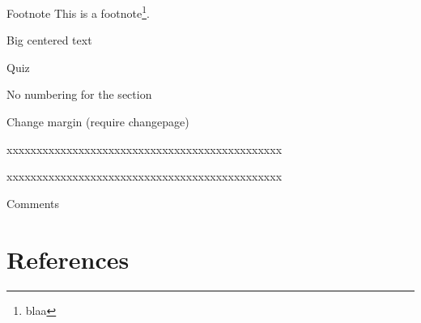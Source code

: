 \documentclass[table]{beamer}
\begin{document}
\begin{frame}[label={sec:orga473990}]{Footnote}
This is a footnote\footnote{blaa}.
\end{frame}
\begin{frame}[label={sec:org0a9c539}]{Big centered text}
\vfill

\begin{center}
\Huge Quiz
\end{center}

\vfill
\end{frame}

\begin{frame}[label={sec:orgf700a10}]{No numbering for the section}
\end{frame}
\begin{frame}[label={sec:orgea60186}]{Change margin}
(require changepage)
\begin{adjustwidth}{-1em}{-1em}
xxxxxxxxxxxxxxxxxxxxxxxxxxxxxxxxxxxxxxxxxxxxxx
\end{adjustwidth}
\begin{adjustwidth}{-3em}{-3em}
xxxxxxxxxxxxxxxxxxxxxxxxxxxxxxxxxxxxxxxxxxxxxx
\end{adjustwidth}
\end{frame}

\begin{frame}[label={sec:orgbb1a811}]{Comments}
\end{frame}
\section{References}
\label{sec:org12667c7}
\begingroup
\renewcommand{\section}[2]{}



\endgroup
\end{document}
